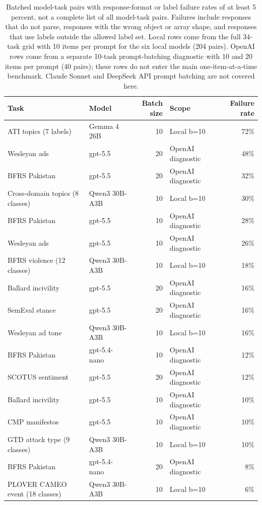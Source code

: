 \begin{table}[H]
\centering
\caption{Batched model-task pairs with response-format or label failure rates of at least 5 percent, not a complete list of all model-task pairs. Failures include responses that do not parse, responses with the wrong object or array shape, and responses that use labels outside the allowed label set. Local rows come from the full 34-task grid with 10 items per prompt for the six local models (204 pairs). OpenAI rows come from a separate 10-task prompt-batching diagnostic with 10 and 20 items per prompt (40 pairs); these rows do not enter the main one-item-at-a-time benchmark. Claude Sonnet and DeepSeek API prompt batching are not covered here. \label{tab:malformed}}
\centering
\fontsize{8}{10}\selectfont
\begin{tabular}[t]{llrlr}
\toprule
Task & Model & Batch size & Scope & Failure rate\\
\midrule
ATI topics (7 labels) & Gemma 4 26B & 10 & Local b=10 & 72\%\\
Wesleyan ads & gpt-5.5 & 20 & OpenAI diagnostic & 48\%\\
BFRS Pakistan & gpt-5.5 & 20 & OpenAI diagnostic & 32\%\\
Cross-domain topics (8 classes) & Qwen3 30B-A3B & 10 & Local b=10 & 30\%\\
BFRS Pakistan & gpt-5.5 & 10 & OpenAI diagnostic & 28\%\\
\addlinespace
Wesleyan ads & gpt-5.5 & 10 & OpenAI diagnostic & 26\%\\
BFRS violence (12 classes) & Qwen3 30B-A3B & 10 & Local b=10 & 18\%\\
Ballard incivility & gpt-5.5 & 20 & OpenAI diagnostic & 16\%\\
SemEval stance & gpt-5.5 & 20 & OpenAI diagnostic & 16\%\\
Wesleyan ad tone & Qwen3 30B-A3B & 10 & Local b=10 & 16\%\\
\addlinespace
BFRS Pakistan & gpt-5.4-nano & 10 & OpenAI diagnostic & 12\%\\
SCOTUS sentiment & gpt-5.5 & 20 & OpenAI diagnostic & 12\%\\
Ballard incivility & gpt-5.5 & 10 & OpenAI diagnostic & 10\%\\
CMP manifestos & gpt-5.5 & 10 & OpenAI diagnostic & 10\%\\
GTD attack type (9 classes) & Qwen3 30B-A3B & 10 & Local b=10 & 10\%\\
\addlinespace
BFRS Pakistan & gpt-5.4-nano & 20 & OpenAI diagnostic & 8\%\\
PLOVER CAMEO event (18 classes) & Qwen3 30B-A3B & 10 & Local b=10 & 6\%\\
\bottomrule
\end{tabular}
\end{table}
